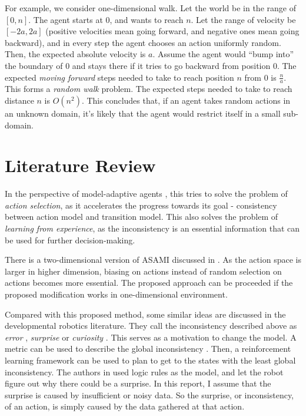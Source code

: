 \documentclass[10pt]{article}
\begin{document}
For example, we consider one-dimensional walk. Let the world be in the
range of $[0,n]$. The agent starts at 0, and wants to reach $n$. Let
the range of velocity be $[-2a, 2a]$ (positive velocities mean going
forward, and negative ones mean going backward), and in every step the
agent chooses an action uniformly random.  Then, the expected absolute
velocity is $a$. Assume the agent would ``bump into'' the boundary of
$0$ and stays there if it tries to go backward from position $0$. The
expected \textit{moving forward} steps needed to take to reach
position $n$ from $0$ is $\frac{n}{a}$. This forms a \textit{random walk}
\cite{motwani1995randomized} problem. The expected steps needed to
take to reach distance $n$ is $O(n^2)$. This concludes that, if an
agent takes random actions in an unknown domain, it's likely that the
agent would restrict itself in a small sub-domain.

\section{Literature Review}

In the perspective of model-adaptive agents \cite{maes1993modeling},
this tries to solve the problem of \textit{action selection}, as it
accelerates the progress towards its goal - consistency between action
model and transition model. This also solves the problem of
\textit{learning from experience}, as the inconsistency is an
essential information that can be used for further decision-making.

There is a two-dimensional version of ASAMI discussed in
\cite{ICRA08-stronger}.  As the action space is larger in higher
dimension, biasing on actions instead of random selection on actions
becomes more essential. The proposed approach can be proceeded if the
proposed modification works in one-dimensional environment.

Compared with this proposed method, some similar ideas are discussed
in the developmental robotics literature. They call the inconsistency
described above as \textit{error} \cite{oudeyer2006discovering},
\textit{surprise} \cite{ranasinghe2008surprise} or \textit{curiosity}
\cite{schmidhuber2006developmental}. This serves as a motivation to
change the model. A metric can be used to describe the global
inconsistency \cite{oudeyer2006discovering}. Then, a reinforcement
learning framework can be used to plan to get to the states with the
least global inconsistency. The authors in
\cite{ranasinghe2008surprise} used logic rules as the model, and let
the robot figure out why there could be a surprise. In this report, I
assume that the surprise is caused by insufficient or noisy data. So
the surprise, or inconsistency, of an action, is simply caused by the
data gathered at that action.
\end{document}
